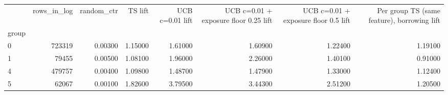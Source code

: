 \begin{tabular}{lrrrrrrr}
\toprule
 & rows\_in\_log & random\_ctr & TS lift & UCB c=0.01 lift & UCB c=0.01 + exposure floor 0.25 lift & UCB c=0.01 + exposure floor 0.5 lift & Per group TS (same feature), borrowing lift \\
group &  &  &  &  &  &  &  \\
\midrule
0 & 723319 & 0.00300 & 1.15000 & 1.61000 & 1.60900 & 1.22400 & 1.19100 \\
1 & 79455 & 0.00500 & 1.08100 & 1.96000 & 2.26000 & 1.40100 & 0.91000 \\
4 & 479757 & 0.00400 & 1.09800 & 1.48700 & 1.47900 & 1.33000 & 1.12400 \\
5 & 62067 & 0.00100 & 1.82600 & 3.79500 & 3.44300 & 2.51200 & 1.20500 \\
\bottomrule
\end{tabular}
